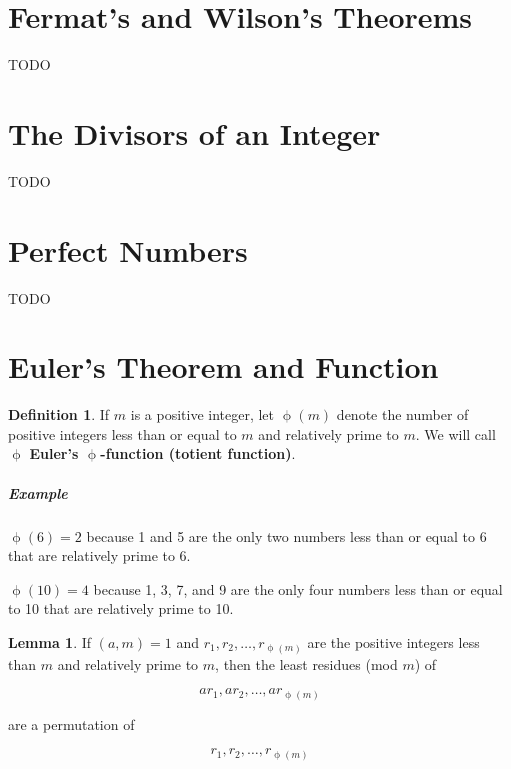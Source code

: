 \documentclass{article}
\theoremstyle{definition} %
\theoremstyle{definition}
\theoremstyle{definition}
\newtheorem{lemma}{Lemma}[section]
\newcommand{\tot}{\upphi}
\theoremstyle{definition}
\newtheorem{definition}{Definition}[section]
\begin{document}
  \section{Fermat's and Wilson's Theorems}
  
  TODO
  
  \section{The Divisors of an Integer}
  
  TODO
  
  \section{Perfect Numbers}
  
  TODO
  
  \section{Euler's Theorem and Function}
  
  \begin{definition}
    If $m$ is a positive integer, let $\tot(m)$ denote the number of positive integers
    less than or equal to $m$ and relatively prime to $m$. We will call $\tot$
    \textbf{Euler's $\tot$-function (totient function)}.
  \end{definition}
  
  \subparagraph{Example} $\tot(6) = 2$ because 1 and 5 are the only two numbers less than
  or equal to 6 that are relatively prime to 6.
  
  $\tot(10) = 4$ because 1, 3, 7, and 9 are the only four numbers less than
  or equal to 10 that are relatively prime to 10.
  
  \begin{lemma}
    If $(a, m) = 1$ and $r_1, r_2, \dots, r_{\tot(m)}$ are the positive integers less than $m$ and
    relatively prime to $m$, then the least residues (mod $m$) of
    
    \begin{equation}
      ar_1, ar_2, \dots, ar_{\tot(m)}
    \end{equation}
    
    are a permutation of
    
    \begin{equation*}
      r_1, r_2, \dots, r_{\tot(m)}
    \end{equation*}
  \end{lemma}
  
\end{document}
